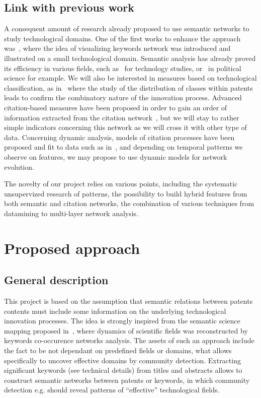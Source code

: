 \subsection{Link with previous work}


A consequent amount of research already proposed to use semantic networks to study technological domains. One of the first works to enhance the approach was~\cite{yoon2004text}, where the idea of visualizing keywords network was introduced and illustrated on a small technological domain. Semantic analysis has already proved its efficiency in various fields, such as~\cite{choi2014patent,fattori2003text} for technology studies, or~\cite{2015arXiv151003797G} in political science for example. We will also be interested in measures based on technological classification, as in~\cite{Youn:2015fk} where the study of the distribution of classes within patents leads to confirm the combinatory nature of the innovation process. Advanced citation-based measures have been proposed in order to gain an order of information extracted from the citation network~\cite{2015arXiv150907285A}, but we will stay to rather simple indicators concerning this network as we will cross it with other type of data. Concerning dynamic analysis, models of citation processes have been proposed and fit to data such as in~\cite{valverde2007topology}, and depending on temporal patterns we observe on features, we may propose to use dynamic models for network evolution.

The novelty of our project relies on various points, including the systematic unsupervized research of patterns, the possibility to build hybrid features from both semantic and citation networks, the combination of various techniques from datamining to multi-layer network analysis.



\section{Proposed approach}

\subsection{General description}

This project is based on the assumption that semantic relations between patents contents must include some information on the underlying technological innovation processes. The idea is strongly inspired from the semantic science mapping proposed in~\cite{chavalarias2013phylomemetic}, where dynamics of scientific fields was reconstructed by keywords co-occurence networks analysis. The assets of such an approach include the fact to be not dependant on predefined fields or domains, what allows specifically to uncover effective domains by community detection. Extracting significant keywords (see technical details) from titles and abstracts allows to construct semantic networks between patents or keywords, in which community detection e.g. should reveal patterns of ``effective'' technological fields.

